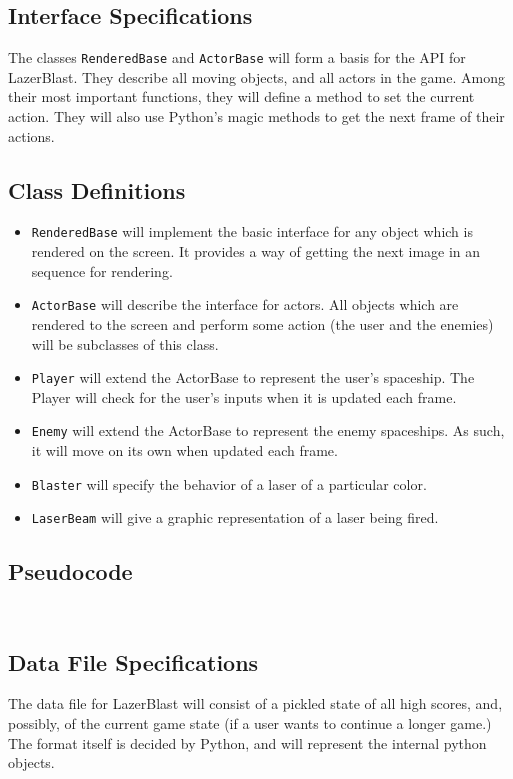 %
\subsection*{Interface Specifications}
    The classes \texttt{RenderedBase} and
    \texttt{ActorBase} will form a basis for
    the API for LazerBlast.  They describe all moving
    objects, and all actors in the game.  Among their
    most important functions, they will define a method
    to set the current action.  They will also use Python's
    magic methods to get the next frame of their actions.

\subsection*{Class Definitions}
    \begin{itemize}
        \item \texttt{RenderedBase} will implement the basic
        interface for any object which is rendered on the screen.
        It provides a way of getting the next image in an sequence
        for rendering.
        \item \texttt{ActorBase} will describe the interface
        for actors.  All objects which are rendered to the screen and
        perform some action (the user and the enemies) will be subclasses
        of this class.
        \item \texttt{Player} will extend the ActorBase to 
        represent the user's spaceship. The Player will check for the user's
        inputs when it is updated each frame.
        \item \texttt{Enemy} will extend the ActorBase to represent
        the enemy spaceships. As such, it will move on its own when updated
        each frame.
        \item \texttt{Blaster} will specify the behavior of a
        laser of a particular color.
        \item \texttt{LaserBeam} will give a graphic representation
        of a laser being fired.

    \end{itemize}
    
\subsection*{Pseudocode}
    \inputminted{python}{../assets/base_classes.py}
    \inputminted{python}{../assets/ships.py}

\subsection*{Data File Specifications}
    The data file for LazerBlast will consist of a
    pickled state of all high scores, and, possibly,
    of the current game state (if a user wants to
    continue a longer game.)  The format itself is
    decided by Python, and will represent the internal
    python objects.
